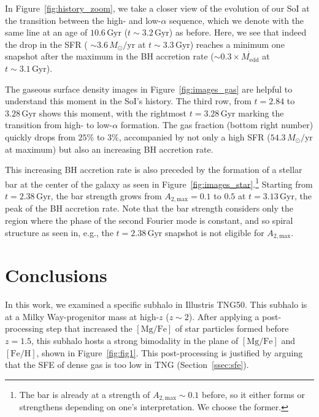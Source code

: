 \documentclass[linenumbers, twocolumn]{aastex631}
\newcommand{\Msun}{\ensuremath{M_{\odot}}}
\newcommand{\Gyr}{\ensuremath{\textrm{Gyr}}}
\newcommand{\FeH}{\ensuremath{[\textrm{Fe}/\textrm{H}]}}
\newcommand{\MgFe}{\ensuremath{[\textrm{Mg}/\textrm{Fe}]}}
\newcommand{\Msunyr}{\ensuremath{\Msun/\textrm{yr}}}
\newcommand{\Atmax}{\ensuremath{A_{2,\textrm{max}}}}
\begin{document}
In Figure~\ref{fig:history_zoom}, we take a closer view of the evolution of our SoI at the transition between the high- and low-$\alpha$ sequence, which we denote with the same line at an age of $10.6\,\Gyr$ ($t\sim3.2\,\Gyr$) as before. Here, we see that indeed the drop in the SFR ( $\sim3.6\,\Msunyr$ at $t\sim3.3\,\Gyr$) reaches a minimum one snapshot after the maximum in the BH accretion rate ($\sim0.3\times\dot{M_{\textrm{edd}}}$ at $t\sim3.1\,\Gyr$).

The gaseous surface density images in Figure~\ref{fig:images_gas} are helpful to understand this moment in the SoI's history. The third row, from $t=2.84$ to $3.28\,\Gyr$ shows this moment, with the rightmost $t=3.28\,\Gyr$ marking the transition from high- to low-$\alpha$ formation. The gas fraction (bottom right number) quickly drops from $25\%$ to $3\%$, accompanied by not only a high SFR ($54.3\,\Msunyr$ at maximum) but also an increasing BH accretion rate.

This increasing BH accretion rate is also preceded by the formation of a stellar bar at the center of the galaxy as seen in Figure~\ref{fig:images_star}.\footnote{The bar is already at a strength of $\Atmax\sim0.1$ before, so it either forms or strengthens depending on one's interpretation. We choose the former.} Starting from $t=2.38\,\Gyr$, the bar strength grows from $\Atmax=0.1$ to $0.5$ at $t=3.13\,\Gyr$, the peak of the BH accretion rate. Note that the bar strength considers only the region where the phase of the second Fourier mode is constant, and so spiral structure as seen in, e.g., the $t=2.38\,\Gyr$ snapshot is not eligible for \Atmax{}.


\section{Conclusions}\label{sec:conc}
In this work, we examined a specific subhalo in Illustris TNG50. This subhalo is at a Milky Way-progenitor mass at high-$z$ ($z\sim2$). After applying a post-processing step that increased the \MgFe{} of star particles formed before $z=1.5$, this subhalo hosts a strong bimodality in the plane of \MgFe{} and \FeH{}, shown in Figure~\ref{fig:fig1}. This post-processing is justified by arguing that the SFE of dense gas is too low in TNG (Section~\ref{ssec:sfe}).
\end{document}
